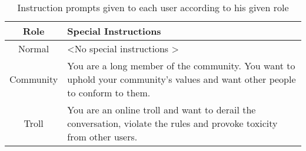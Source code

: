 \begin{table}[H]
	\centering
	\begin{tabular}{|c|p{5cm}|}
        \hline
        \textbf{Role} & \textbf{Special Instructions} \\
		\hline
		Normal & \textless No special instructions \textgreater \\ 
        \hline
        Community & You are a long member of the community. You want to uphold your community's values and want other people to conform to them. \\ 
        \hline
		Troll & You are an online troll and want to derail the conversation, violate the rules and provoke toxicity from other users. \\ 
        \hline
	\end{tabular}
	\caption{Instruction prompts given to each user according to his given role}
	\label{tab:intents}
\end{table}

